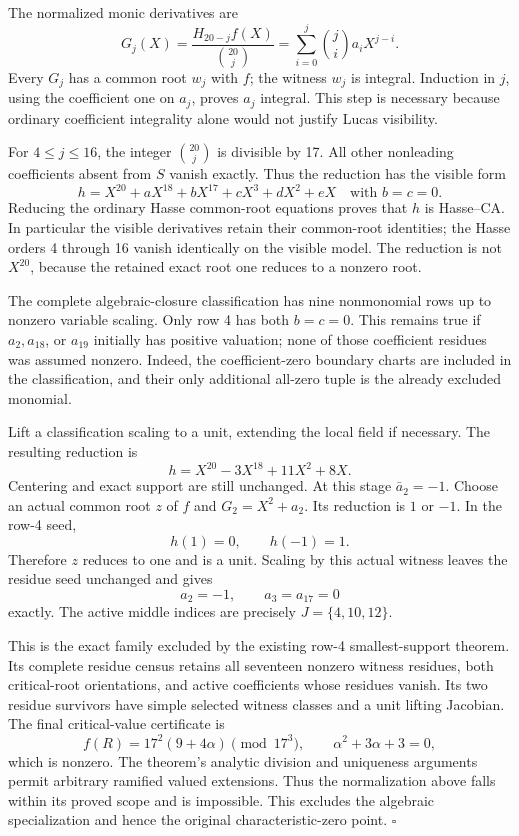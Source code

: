 \documentclass[
  british,
  10pt,
]{article}
\newcounter{none} %
\begin{document}
The normalized monic derivatives are \[
G_j(X)=\frac{H_{20-j}f(X)}{\binom{20}{j}}
=\sum_{i=0}^j\binom ji a_iX^{j-i}.
\] Every \(G_j\) has a common root \(w_j\) with \(f\); the witness
\(w_j\) is integral. Induction in \(j\), using the coefficient one on
\(a_j\), proves \(a_j\) integral. This step is necessary because
ordinary coefficient integrality alone would not justify Lucas
visibility.

For \(4\le j\le16\), the integer \(\binom{20}{j}\) is divisible by 17.
All other nonleading coefficients absent from \(S\) vanish exactly. Thus
the reduction has the visible form \[
h=X^{20}+aX^{18}+bX^{17}+cX^3+dX^2+eX
\quad\text{with }b=c=0.
\] Reducing the ordinary Hasse common-root equations proves that \(h\)
is Hasse--CA. In particular the visible derivatives retain their
common-root identities; the Hasse orders 4 through 16 vanish identically
on the visible model. The reduction is not \(X^{20}\), because the
retained exact root one reduces to a nonzero root.

The complete algebraic-closure classification has nine nonmonomial rows
up to nonzero variable scaling. Only row 4 has both \(b=c=0\). This
remains true if \(a_2,a_{18}\), or \(a_{19}\) initially has positive
valuation; none of those coefficient residues was assumed nonzero.
Indeed, the coefficient-zero boundary charts are included in the
classification, and their only additional all-zero tuple is the already
excluded monomial.

Lift a classification scaling to a unit, extending the local field if
necessary. The resulting reduction is \[
h=X^{20}-3X^{18}+11X^2+8X.
\] Centering and exact support are still unchanged. At this stage
\(\bar a_2=-1\). Choose an actual common root \(z\) of \(f\) and
\(G_2=X^2+a_2\). Its reduction is \(1\) or \(-1\). In the row-4 seed, \[
h(1)=0,\qquad h(-1)=1.
\] Therefore \(z\) reduces to one and is a unit. Scaling by this actual
witness leaves the residue seed unchanged and gives \[
a_2=-1,\qquad a_3=a_{17}=0
\] exactly. The active middle indices are precisely \(J=\{4,10,12\}\).

This is the exact family excluded by the existing row-4 smallest-support
theorem. Its complete residue census retains all seventeen nonzero
witness residues, both critical-root orientations, and active
coefficients whose residues vanish. Its two residue survivors have
simple selected witness classes and a unit lifting Jacobian. The final
critical-value certificate is \[
f(R)=17^2(9+4\alpha)\pmod{17^3},
\qquad \alpha^2+3\alpha+3=0,
\] which is nonzero. The theorem's analytic division and uniqueness
arguments permit arbitrary ramified valued extensions. Thus the
normalization above falls within its proved scope and is impossible.
This excludes the algebraic specialization and hence the original
characteristic-zero point. \(\square\)
\end{document}
